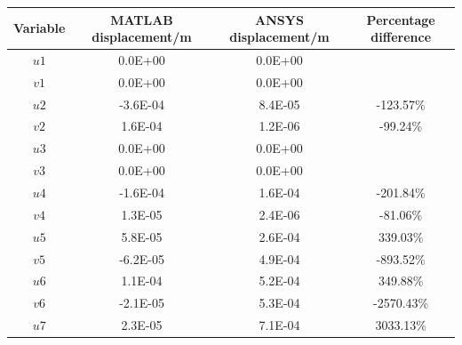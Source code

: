 \documentclass[11pt]{article}
\begin{document}
\begin{table}[H]
    \centering
    \begin{tabular}{@{}cSSc@{}}
        \toprule
        \textbf{Variable} & \textbf{MATLAB displacement/m} & \textbf{ANSYS displacement/m} & \textbf{Percentage difference} \\
        \midrule
        $u1$              & 0.0E+00                        & 0.0E+00                       &                                \\
        $v1$              & 0.0E+00                        & 0.0E+00                       &                                \\
        $u2$              & -3.6E-04                       & 8.4E-05                       & -123.57\%                      \\
        $v2$              & 1.6E-04                        & 1.2E-06                       & -99.24\%                       \\
        $u3$              & 0.0E+00                        & 0.0E+00                       &                                \\
        $v3$              & 0.0E+00                        & 0.0E+00                       &                                \\
        $u4$              & -1.6E-04                       & 1.6E-04                       & -201.84\%                      \\
        $v4$              & 1.3E-05                        & 2.4E-06                       & -81.06\%                       \\
        $u5$              & 5.8E-05                        & 2.6E-04                       & 339.03\%                       \\
        $v5$              & -6.2E-05                       & 4.9E-04                       & -893.52\%                      \\
        $u6$              & 1.1E-04                        & 5.2E-04                       & 349.88\%                       \\
        $v6$              & -2.1E-05                       & 5.3E-04                       & -2570.43\%                     \\
        $u7$              & 2.3E-05                        & 7.1E-04                       & 3033.13\%                      \\

\end{tabular}
\end{table}
\end{document}
